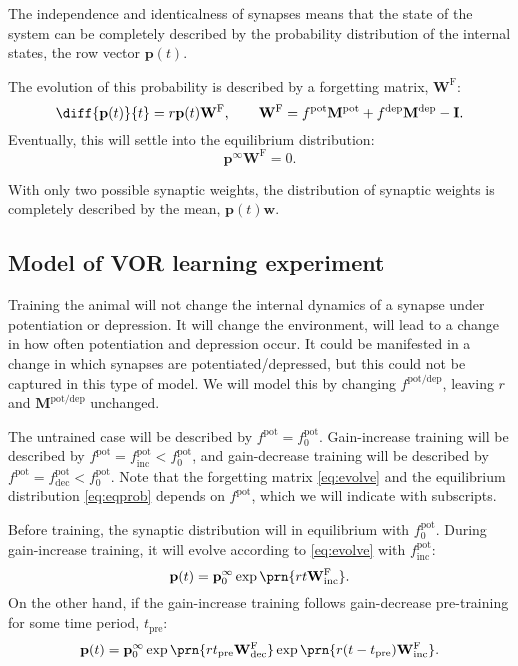 \documentclass[12pt]{article}
\newcommand{\I}{\mathbf{I}}
\newcommand{\pr}{\mathbf{p}}
\newcommand{\eq}{\pr^\infty}
\newcommand{\w}{\mathbf{w}}
\newcommand{\W}{\mathbf{W}}
\newcommand{\frg}{\W^\mathrm{F}}
\newcommand{\M}{\mathbf{M}}
\newcommand{\pot}{^{\text{pot}}}
\newcommand{\dep}{^{\text{dep}}}
\newcommand{\potdep}{^{\text{pot/dep}}}
\newcommand{\norm}{_0}
\newcommand{\inc}{_{\text{inc}}}
\newcommand{\dec}{_{\text{dec}}}
\newcommand{\tpre}{t_{\text{pre}}}
\begin{document}
The independence and identicalness of synapses means that the state of the system can be completely described by the probability distribution of the internal states, the row vector $\pr(t)$.

The evolution of this probability is described by a forgetting matrix, $\frg$:
%
\begin{equation}\label{eq:evolve}
  \diff{\pr(t)}{t} = r\pr(t)\frg,
  \qquad
  \frg = f\pot\M\pot+f\dep\M\dep-\I.
\end{equation}
%
Eventually, this will settle into the equilibrium distribution:
%
\begin{equation}\label{eq:eqprob}
  \eq\frg=0.
\end{equation}
%



With only two possible synaptic weights, the distribution of synaptic weights is completely described by the mean, $\pr(t)\w$.


\subsection{Model of VOR learning experiment}\label{sec:learning}

Training the animal will not change the internal dynamics of a synapse under potentiation or depression.
It will change the environment, will lead to a change in how often potentiation and depression occur.
It could be manifested in a change in which synapses are potentiated/depressed, but this could not be captured in this type of model.
We will model this by changing $f\potdep$, leaving $r$ and $\M\potdep$ unchanged.

The untrained case will be described by $f\pot=f\pot\norm$.
Gain-increase training  will be described by $f\pot=f\pot\inc<f\pot\norm$, and
gain-decrease training  will be described by $f\pot=f\pot\dec<f\pot\norm$. Note that the forgetting matrix \eqref{eq:evolve} and the equilibrium distribution \eqref{eq:eqprob} depends on $f\pot$, which we will indicate with subscripts.

Before training, the synaptic distribution will in equilibrium with $f\pot\norm$.
During gain-increase training, it will evolve according to \eqref{eq:evolve} with $f\pot\inc$:
%
\begin{equation}\label{eq:nopre}
  \pr(t) = \eq\norm \exp\prn{rt\frg\inc}.
\end{equation}
%
On the other hand, if the gain-increase training follows gain-decrease pre-training for some time period, $\tpre$:
%
\begin{equation}\label{eq:withpre}
  \pr(t) = \eq\norm \exp\prn{r\tpre\frg\dec} \exp\prn{r(t-\tpre)\frg\inc}.
\end{equation}
%
\end{document}
